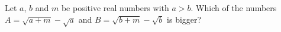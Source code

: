 Let $a$, $b$ and $m$ be positive real numbers with $a>b$. Which of the numbers $A=\sqrt{a+m}-\sqrt a$ and $B=\sqrt{b+m}-\sqrt b$ is bigger?
